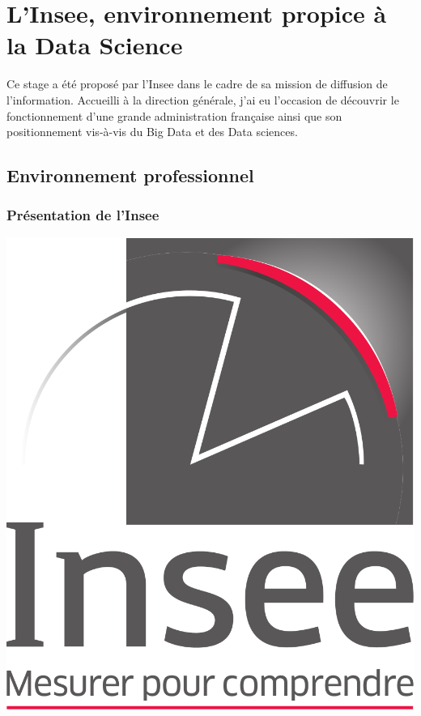 \section{L'Insee, environnement propice à la Data Science}
Ce stage a été proposé par l'Insee dans le cadre de sa mission de diffusion de l'information. Accueilli à la direction générale, j'ai eu l'occasion de découvrir le fonctionnement d'une grande administration française ainsi que son positionnement vis-à-vis du Big Data et des Data sciences.

\subsection{Environnement professionnel}

\subsubsection{Présentation de l'Insee}
\vspace{10pt}
\begin{center}
\includegraphics[scale=0.12]{images/Logo_Insee.png} 
\end{center}

